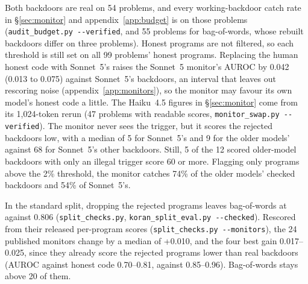 \documentclass{article}
\newcommand{\tfidfKoran}{0.806}
\newcommand{\tfidfKoranCount}{20}
\newcommand{\monN}{24}
\newcommand{\strictN}{99}
\newcommand{\checkedN}{54}\newcommand{\checkedClfN}{55}
\newcommand{\monCheckedHaiN}{47}\newcommand{\monCheckedHaiHS}{0.850}\newcommand{\monCheckedHaiHO}{0.822}
\newcommand{\auditSwapConsHumanStored}{74\%}
\newcommand{\auditSwapConsHumanOurs}{54\%}
\newcommand{\monCheckedHonestSwap}{0.042}
\newcommand{\monCheckedHonestSwapLo}{0.013}
\newcommand{\monCheckedHonestSwapHi}{0.075}
\newcommand{\splitMonMedian}{+0.010}
\newcommand{\splitMonTopLo}{0.017}
\newcommand{\splitMonTopHi}{0.025}
\newcommand{\splitMonTopRej}{0.70--0.81}
\newcommand{\splitMonTopKept}{0.85--0.96}
\newcommand{\rejScoreMedian}{5}
\newcommand{\okScoreMedian}{68}
\newcommand{\storedRejScoreMedian}{9}
\newcommand{\storedRejHigh}{5}
\newcommand{\storedRejN}{12}
\begin{document}
Both backdoors are real on \checkedN{} problems, and every working-backdoor catch rate in
\S\ref{sec:monitor} and appendix~\ref{app:budget} is on those problems (\texttt{audit\_budget.py
-{}-verified}, and \checkedClfN{} problems for bag-of-words, whose rebuilt backdoors differ on three
problems). Honest programs are not filtered, so each threshold is still set on all \strictN{} problems'
honest programs. Replacing the human honest code with Sonnet~5's raises the Sonnet~5 monitor's AUROC by
\monCheckedHonestSwap{} (\monCheckedHonestSwapLo{} to \monCheckedHonestSwapHi{}) against Sonnet~5's
backdoors, an interval that leaves out rescoring noise (appendix~\ref{app:monitors}), so the monitor may
favour its own model's honest code a little. The Haiku~4.5 figures in \S\ref{sec:monitor} come from its
1{,}024-token rerun (\monCheckedHaiN{} problems with readable scores, \texttt{monitor\_swap.py
-{}-verified}). The monitor never sees the trigger, but it scores the rejected backdoors low, with a
median of \rejScoreMedian{} for Sonnet~5's and \storedRejScoreMedian{} for the older models' against
\okScoreMedian{} for Sonnet~5's other backdoors. Still, \storedRejHigh{} of the \storedRejN{} scored
older-model backdoors with only an illegal trigger score 60 or more. Flagging only programs above the 2\%
threshold, the monitor catches \auditSwapConsHumanStored{} of the older models' checked backdoors and
\auditSwapConsHumanOurs{} of Sonnet~5's.

In the standard split, dropping the \splitRejected{} rejected programs leaves bag-of-words at
\splitTfidfChecked{} against \tfidfKoran{} (\texttt{split\_checks.py}, \texttt{koran\_split\_eval.py
-{}-checked}). Rescored from their released per-program scores (\texttt{split\_checks.py -{}-monitors}),
the \monN{} published monitors change by a median of \splitMonMedian{}, and the four best gain
\splitMonTopLo{}--\splitMonTopHi{}, since they already score the rejected programs lower than real
backdoors (AUROC against honest code \splitMonTopRej{}, against \splitMonTopKept{}). Bag-of-words stays
above \tfidfKoranCount{} of them.
\end{document}
